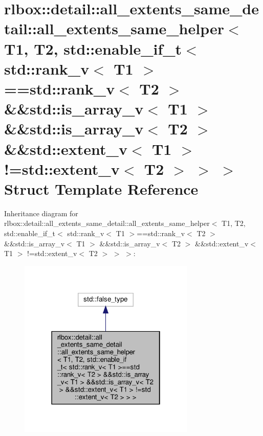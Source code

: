 \hypertarget{structrlbox_1_1detail_1_1all__extents__same__detail_1_1all__extents__same__helper_3_01T1_00_01T2c85c414d786e56b573ef092d9cd9401b}{}\section{rlbox\+:\+:detail\+:\+:all\+\_\+extents\+\_\+same\+\_\+detail\+:\+:all\+\_\+extents\+\_\+same\+\_\+helper$<$ T1, T2, std\+:\+:enable\+\_\+if\+\_\+t$<$ std\+:\+:rank\+\_\+v$<$ T1 $>$==std\+:\+:rank\+\_\+v$<$ T2 $>$ \&\&std\+:\+:is\+\_\+array\+\_\+v$<$ T1 $>$ \&\&std\+:\+:is\+\_\+array\+\_\+v$<$ T2 $>$ \&\&std\+:\+:extent\+\_\+v$<$ T1 $>$ !=std\+:\+:extent\+\_\+v$<$ T2 $>$ $>$ $>$ Struct Template Reference}
\label{structrlbox_1_1detail_1_1all__extents__same__detail_1_1all__extents__same__helper_3_01T1_00_01T2c85c414d786e56b573ef092d9cd9401b}


Inheritance diagram for rlbox\+:\+:detail\+:\+:all\+\_\+extents\+\_\+same\+\_\+detail\+:\+:all\+\_\+extents\+\_\+same\+\_\+helper$<$ T1, T2, std\+:\+:enable\+\_\+if\+\_\+t$<$ std\+:\+:rank\+\_\+v$<$ T1 $>$==std\+:\+:rank\+\_\+v$<$ T2 $>$ \&\&std\+:\+:is\+\_\+array\+\_\+v$<$ T1 $>$ \&\&std\+:\+:is\+\_\+array\+\_\+v$<$ T2 $>$ \&\&std\+:\+:extent\+\_\+v$<$ T1 $>$ !=std\+:\+:extent\+\_\+v$<$ T2 $>$ $>$ $>$\+:
\nopagebreak
\begin{figure}[H]
\begin{center}
\leavevmode
\includegraphics[width=238pt]{structrlbox_1_1detail_1_1all__extents__same__detail_1_1all__extents__same__helper_3_01T1_00_01T2d26e799d2358c1b5289bc704cff16ad5}
\end{center}
\end{figure}


